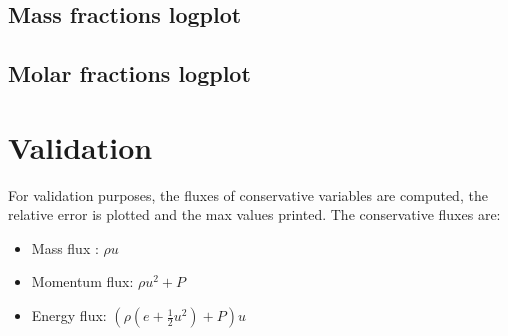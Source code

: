 \documentclass[letterpaper,10pt,english]{jupyterBook}
\begin{document}
\subsection{Mass fractions log\sphinxhyphen{}plot}
\label{\detokenize{2_Temperature/_2T_Problem_class_definition:mass-fractions-log-plot}}

\subsection{Molar fractions log\sphinxhyphen{}plot}
\label{\detokenize{2_Temperature/_2T_Problem_class_definition:molar-fractions-log-plot}}

\section{Validation}
\label{\detokenize{2_Temperature/_2T_Problem_class_definition:validation}}
\sphinxAtStartPar
For validation purposes, the fluxes of conservative variables are computed, the relative error is plotted and the max values printed. 
The conservative fluxes are:
\begin{itemize}
\item {} 
\sphinxAtStartPar
Mass flux : \( \rho u\)

\item {} 
\sphinxAtStartPar
Momentum flux: \( \rho u^2 + P \)

\item {} 
\sphinxAtStartPar
Energy flux: \( ( \rho ( e + \frac{1}{2} u ^ 2 ) + P ) u \)

\end{itemize}
\end{document}
